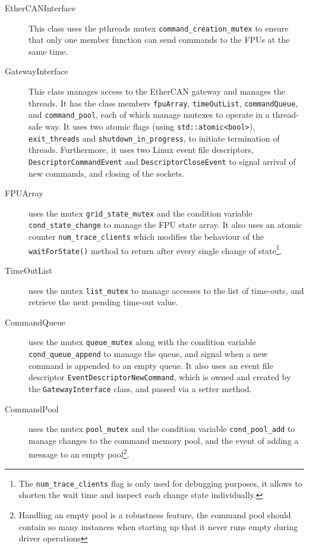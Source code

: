 \documentclass[fontsize=12,a4paper]{scrartcl}
\begin{document}
\begin{description}
\item[EtherCANInterface] This class uses the pthreads mutex
  \texttt{command\_creation\_mutex} to ensure that only one member
  function can send commands to the FPUs at the same time.
\item[GatewayInterface] This class manages access to the EtherCAN
  gateway and manages the threads.  It has the class members
  \texttt{fpuArray}, \texttt{timeOutList}, \texttt{commandQueue}, and
  \texttt{command\_pool}, each of which manage mutexes to operate in a
  thread-safe way. It uses two atomic flags (using
  \texttt{std::atomic<bool>}), \texttt{exit\_threads} and
  \texttt{shutdown\_in\_progress}, to initiate termination of threads.
  Furthermore, it uses two Linux event file descriptors,
  \texttt{DescriptorCommandEvent} and \texttt{DescriptorCloseEvent} to
  signal arrival of new commands, and closing of the sockets.

\item[FPUArray] uses the mutex \texttt{grid\_state\_mutex} and the
  condition variable \texttt{cond\_state\_change} to manage the FPU
  state array. It also uses an atomic counter
  \texttt{num\_trace\_clients} which modifies the behaviour of the
  \texttt{waitForState()} method to return after every single change
  of state\footnote{The \texttt{num\_trace\_clients} flag is only used
    for debugging purposes, it allows to shorten the wait time and
    inspect each change state individually.}.
\item[TimeOutList] uses the mutex \texttt{list\_mutex} to manage
  accesses to the list of time-outs, and retrieve the next pending
  time-out value.
\item[CommandQueue] uses the mutex \texttt{queue\_mutex} along with
  the condition variable \texttt{cond\_queue\_append} to manage the
  queue, and signal when a new command is appended to an empty queue.
  It also uses an event file descriptor
  \texttt{EventDescriptorNewCommand}, which is owned and created by
  the \texttt{GatewayInterface} class, and passed via a setter method.
\item[CommandPool] uses the mutex \texttt{pool\_mutex} and the
  condition variable \texttt{cond\_pool\_add} to manage changes to the
  command memory pool, and the event of adding a message to an empty
  pool\footnote{Handling an empty pool is a robustness feature, the
    command pool should contain so many instances when starting up
    that it never runs empty during driver operations}.
\end{description}
\end{document}

